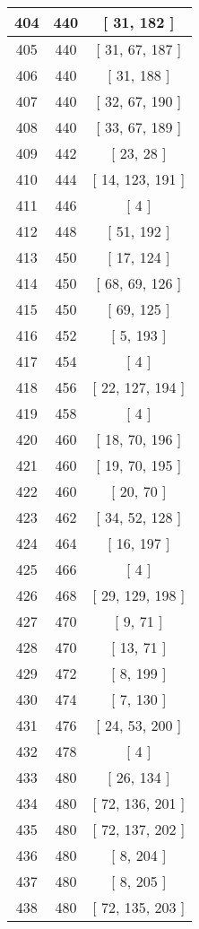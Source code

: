 \begin{center}
\begin{longtable}[H]{|| c c c ||}
\\\hline
404 & 440 & [ 31, 182 ]
\\\hline
405 & 440 & [ 31, 67, 187 ]
\\\hline
406 & 440 & [ 31, 188 ]
\\\hline
407 & 440 & [ 32, 67, 190 ]
\\\hline
408 & 440 & [ 33, 67, 189 ]
\\\hline
409 & 442 & [ 23, 28 ]
\\\hline
410 & 444 & [ 14, 123, 191 ]
\\\hline
411 & 446 & [ 4 ]
\\\hline
412 & 448 & [ 51, 192 ]
\\\hline
413 & 450 & [ 17, 124 ]
\\\hline
414 & 450 & [ 68, 69, 126 ]
\\\hline
415 & 450 & [ 69, 125 ]
\\\hline
416 & 452 & [ 5, 193 ]
\\\hline
417 & 454 & [ 4 ]
\\\hline
418 & 456 & [ 22, 127, 194 ]
\\\hline
419 & 458 & [ 4 ]
\\\hline
420 & 460 & [ 18, 70, 196 ]
\\\hline
421 & 460 & [ 19, 70, 195 ]
\\\hline
422 & 460 & [ 20, 70 ]
\\\hline
423 & 462 & [ 34, 52, 128 ]
\\\hline
424 & 464 & [ 16, 197 ]
\\\hline
425 & 466 & [ 4 ]
\\\hline
426 & 468 & [ 29, 129, 198 ]
\\\hline
427 & 470 & [ 9, 71 ]
\\\hline
428 & 470 & [ 13, 71 ]
\\\hline
429 & 472 & [ 8, 199 ]
\\\hline
430 & 474 & [ 7, 130 ]
\\\hline
431 & 476 & [ 24, 53, 200 ]
\\\hline
432 & 478 & [ 4 ]
\\\hline
433 & 480 & [ 26, 134 ]
\\\hline
434 & 480 & [ 72, 136, 201 ]
\\\hline
435 & 480 & [ 72, 137, 202 ]
\\\hline
436 & 480 & [ 8, 204 ]
\\\hline
437 & 480 & [ 8, 205 ]
\\\hline
438 & 480 & [ 72, 135, 203 ]
\\\hline

\end{longtable}
\end{center}
